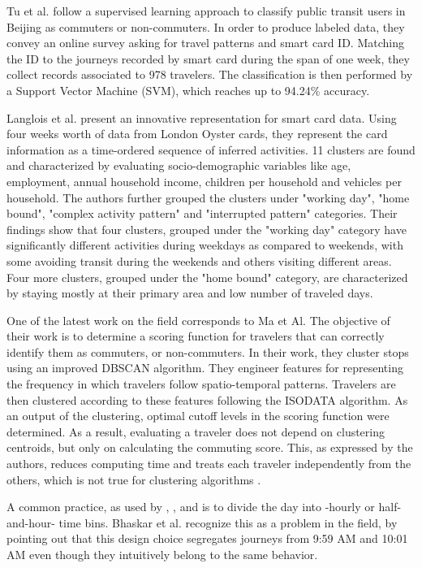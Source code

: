 \documentclass{article}
\begin{document}
Tu et al. follow a supervised learning approach to classify public transit users in Beijing as commuters or non-commuters. In order to produce labeled data, they convey an online survey asking for travel patterns and smart card ID. Matching the ID to the journeys recorded by smart card during the span of one week, they collect records associated to 978 travelers. The classification is then performed by a Support Vector Machine (SVM), which reaches up to 94.24\% accuracy. \cite{tu2016impact}

Langlois et al. present an innovative representation for smart card data. Using four weeks worth of data from London Oyster cards, they represent the card information as a time-ordered sequence of inferred activities.  11 clusters are found and characterized by evaluating socio-demographic variables like age, employment, annual household income, children per household and vehicles per household. The authors further grouped the clusters under "working day", "home bound", "complex activity pattern" and "interrupted pattern" categories. Their findings show that four clusters, grouped under the "working day" category have significantly different activities during weekdays as compared to weekends, with some avoiding transit during the weekends and others visiting different areas.  Four more clusters, grouped under the "home bound" category, are characterized by staying mostly at their primary area and low number of traveled days. \cite{langlois2016inferring}

One of the latest work on the field corresponds to Ma et Al. The objective of their work is to determine a scoring function for travelers that can correctly identify them as commuters, or non-commuters. In their work, they cluster stops using an improved DBSCAN algorithm. They engineer features for representing the frequency in which travelers follow spatio-temporal patterns. Travelers are then clustered according to these features following the ISODATA algorithm. As an output of the clustering, optimal cutoff levels in the scoring function were determined. As a result, evaluating a traveler does not depend on clustering centroids, but only on calculating the commuting score. This, as expressed by the authors, reduces computing time and treats each traveler independently from the others, which is not true for clustering algorithms \cite{ma2017understanding}.

A common practice, as used by \cite{ma2017understanding}, \cite{langlois2016inferring}, and \cite{morency2007measuring} is to divide the day into -hourly or half-and-hour- time bins. Bhaskar et al. recognize this as a problem in the field, by pointing out that this design choice segregates journeys from 9:59 AM and 10:01 AM even though they intuitively belong to the same behavior. 
\end{document}
